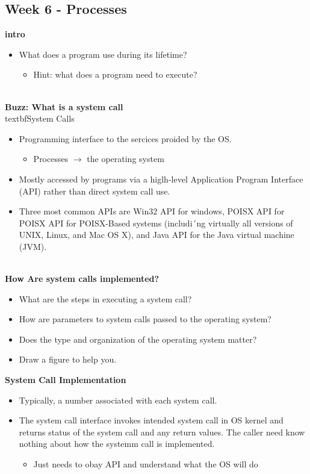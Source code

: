 
\subsection*{Week 6 - Processes}
\textbf{intro}
\begin{itemize}
\item What does a program use during its lifetime?
\begin{itemize}
\item Hint: what does a program need to execute?
\end{itemize}
\end{itemize}
\\
\textbf{Buzz: What is a system call}
\\
textbf{System Calls}
\begin{itemize}
\item Programming interface to the sercices proided by the OS.
\begin{itemize}
\item Processes $\rightarrow$ the operating system
\end{itemize}
\item Mostly accessed by programs via a higlh-level Application Program Interface (API) rather than direct system call use.
\item Three most common APIs are Win32 API for windows, POISX API for POISX API for POISX-Based systems (includi´ng virtually all versions of UNIX, Linux, and Mac OS X), and Java API for the Java virtual machine (JVM).
\end{itemize}
\\
\textbf{How Are system calls implemented?}
\begin{itemize}
\item What are the steps in executing a system call? 
\item How are parameters to system calls passed to the operating system?
\item Does the type and organization of the operating system matter?
\item Draw a figure to help you.
\end{itemize}
\textbf{System Call Implementation}
\begin{itemize}
\item Typically, a number associated with each system call.
\item The system call interface invokes intended system call in OS kernel and returns status of the system call and any return values.
The caller need know nothing about how the systemm call is implemented.
\begin{itemize}
\item Just needs to obay API and understand what the OS will do
\end{itemize}
\end{itemize}